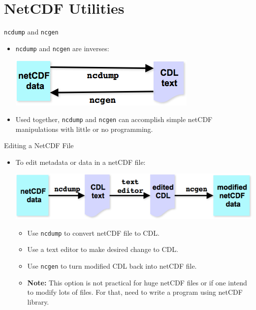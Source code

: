 \documentclass[compress,11pt,xcolor=svgnames,aspectratio=169]{beamer}
\begin{document}
\section{NetCDF Utilities}

\begin{frame}[fragile]{\texttt{ncdump} and \texttt{ncgen}}

\begin{itemize}
\setlength\itemsep{0.6cm}

  \item \texttt{ncdump} and \texttt{ncgen} are inverses:\\[0.4cm]

  \begin{center}
  \includegraphics[scale=0.5]{fig/nc-inv}
  \end{center}

  \item Used together, \texttt{ncdump} and \texttt{ncgen} can accomplish simple netCDF manipulations with little or no programming.

\end{itemize}

\end{frame}

\begin{frame}[fragile]{Editing a NetCDF File}

\begin{itemize}
\setlength\itemsep{0.6cm}
  \item To edit metadata or data in a netCDF file:

\begin{center}
\includegraphics[scale=0.5]{fig/nc-edit}
\end{center}

  \begin{itemize}
  \setlength\itemsep{0.3cm}
    \item Use \texttt{ncdump} to convert netCDF file to CDL.
    \item Use a text editor to make desired change to CDL.
    \item Use \texttt{ncgen} to turn modified CDL back into netCDF file.
    \item \textbf{Note:} This option is not practical for huge netCDF files or if one intend to modify lots of files. For that, need to write a program using netCDF library.
  \end{itemize}

\end{itemize}

\end{frame}
\end{document}

